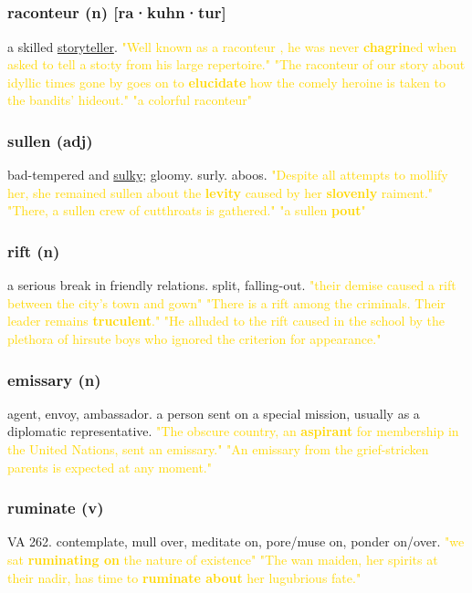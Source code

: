 \documentclass{proc}
\begin{document}
	\newpage
	\subsection{}
	\subsubsection{\textcolor{brickred}{raconteur} (n) [ra·kuhn·tur]}
	a skilled \underline{storyteller}.
	\textcolor{gold}{"Well known as a raconteur , he was never \textbf{chagrin}ed when asked to tell a sto:ty from his large repertoire." "The raconteur of our story about idyllic times gone by goes on to \textbf{elucidate} how the comely heroine is taken to the bandits' hideout." "a colorful raconteur"}
	
	\subsubsection{\textcolor{brickred}{sullen} (adj)}
	bad-tempered and \underline{sulky}; gloomy. surly. aboos.
	\textcolor{gold}{"Despite all attempts to mollify her, she remained sullen about the \textbf{levity} caused by her \textbf{slovenly} raiment." "There, a sullen crew of cutthroats is gathered." "a sullen \textbf{pout}"}
	
	\subsubsection{\textcolor{brickred}{rift} (n)}
	a serious break in friendly relations. split, falling-out.
	\textcolor{gold}{"their demise caused a rift between the city's town and gown" "There is a rift among the criminals. Their leader remains \textbf{truculent}." "He alluded to the rift caused in the school by the plethora of hirsute boys who ignored the criterion for appearance."}
	
	\subsubsection{\textcolor{brickred}{emissary} (n)}
	agent, envoy, ambassador. a person sent on a special mission, usually as a diplomatic representative.
	\textcolor{gold}{"The obscure country, an \textbf{aspirant} for membership in the United Nations, sent an emissary." "An emissary from the grief-stricken parents is expected at any moment."}
	
	\subsubsection{\textcolor{brickred}{ruminate} (v)}
	VA 262. contemplate, mull over,
	meditate on,
	pore/muse on,
	ponder on/over.
	\textcolor{gold}{"we sat \textbf{ruminating on} the nature of existence" "The wan maiden, her spirits at their nadir, has time to \textbf{ruminate about} her lugubrious fate."}
	
\end{document}
